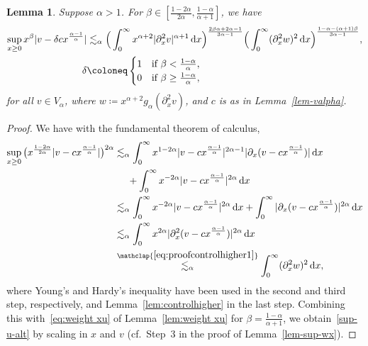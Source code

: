 \documentclass[reqno,12pt]{amsart}
\renewcommand{\d}{\ensuremath{\mathrm{d}}}
\renewcommand{\d}{\ensuremath{{\rm d}}}
\newtheorem{lemma}[theorem]{Lemma}
\numberwithin{equation}{section}
\begin{document}
%
\begin{lemma}\label{lem-sup-u-alt}
Suppose $\alpha >1$. For $\beta \in [\frac{1-2\alpha}{2\alpha},\frac{1-\alpha}{\alpha+1}]$, we have
%
\begin{align}\nonumber
\sup_{x \ge 0} x^\beta |v - \delta c x^{\frac{\alpha-1}{\alpha}}| &\lesssim_\alpha \Big(\int_0^\infty x^{\alpha+2} |\partial_x^2 v|^{\alpha+1} \, \d x\Big)^{\frac{2\beta\alpha+2\alpha-1}{3\alpha-1}} \Big(\int_0^\infty (\partial_x^2 w)^2 \, \d x\Big)^{\frac{1-\alpha- (\alpha+1)\beta}{3\alpha-1}},  \\
\delta &\coloneq \begin{cases} 1 & \text{if } \beta < \frac{1-\alpha}{\alpha}, \\ 0 & \text{if } \beta \ge \frac{1-\alpha}{\alpha}, \end{cases} \label{sup-u-alt}
\end{align}
%
for all $v \in V_\alpha$, where $w \coloneq x^{\alpha+2} g_\alpha(\partial_x^2 v)$, and $c$ is as in Lemma~\ref{lem-valpha}.
\end{lemma}
%

%
\begin{proof}
We have with the fundamental theorem of calculus, 
%
\begin{align*}
\sup_{x \ge 0} \big(x^{\frac{1-2\alpha}{2\alpha}} |v - c x^{\frac{\alpha-1}{\alpha}}|\big)^{2\alpha} &\lesssim_\alpha \int_0^\infty x^{1-2\alpha} |v - c x^{\frac{\alpha-1}{\alpha}}|^{2\alpha-1} |\partial_x(v - c x^{\frac{\alpha-1}{\alpha}})| \, \d x \\
&\phantom{\lesssim_\alpha} + \int_0^\infty x^{-2\alpha} |v - c x^{\frac{\alpha-1}{\alpha}}|^{2\alpha} \, \d x \\
&\lesssim_\alpha \int_0^\infty x^{-2\alpha} |v - c x^{\frac{\alpha-1}{\alpha}}|^{2\alpha} \, \d x + \int_0^\infty |\partial_x(v - c x^{\frac{\alpha-1}{\alpha}})|^{2\alpha} \, \d x \\
&\lesssim_\alpha \int_0^\infty x^{2\alpha} |\partial_x^2(v - c x^{\frac{\alpha-1}{\alpha}})|^{2\alpha} \, \d x \\
&\stackrel{\mathclap{\eqref{eq:proofcontrolhigher1}}}{\lesssim_\alpha} \int_0^\infty (\partial_x^2 w)^2 \, \d x,
\end{align*}
%
where Young's and Hardy's inequality have been used in the second and third step, respectively, and Lemma~\ref{lem:controlhigher} in the last step. Combining this with~\eqref{eq:weight xu} of Lemma~\ref{lem:weight xu} for
$\beta = \tfrac{1-\alpha}{\alpha+1}$, we obtain~\eqref{sup-u-alt} by scaling
in $x$ and $v$ (cf.~Step~3 in the proof of Lemma~\ref{lem-sup-wx}).
\end{proof}
%
\end{document}
